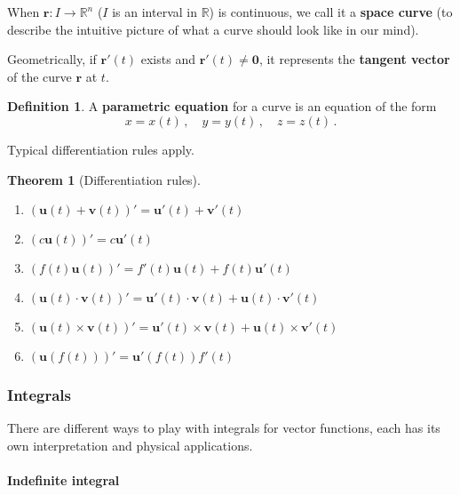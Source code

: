 \documentclass[
]{article}
\newtheorem{theorem}{Theorem}[section]
\theoremstyle{definition}
\newtheorem{definition}{Definition}[section]
\theoremstyle{definition}
\theoremstyle{definition}
\theoremstyle{definition}
\theoremstyle{remark}
\begin{document}
When \(\mathbf{r}:I \to \mathbb{R}^n\) (\(I\) is an interval in \(\mathbb{R}\)) is continuous,
we call it a \textbf{space curve} (to describe the intuitive picture of what
a curve should look like in our mind).

Geometrically, if \(\mathbf{r}'(t)\) exists and \(\mathbf{r}'(t) \not= \mathbf{0}\), it
represents the \textbf{tangent vector} of the curve \(\mathbf{r}\) at \(t\).

\begin{definition}
A \textbf{parametric equation} for a curve is an equation of the form
\[
x=x(t)\,, \quad  y = y(t)\,, \quad z = z(t) \,.
\]
\end{definition}

Typical differentiation rules apply.

\begin{theorem}[Differentiation rules]
\leavevmode

\begin{enumerate}
\def\labelenumi{\arabic{enumi}.}
\item
  \((\mathbf{u}(t) + \mathbf{v}(t))' = \mathbf{u}'(t) + \mathbf{v}'(t)\)
\item
  \((c \mathbf{u}(t))' = c \mathbf{u}'(t)\)
\item
  \((f(t) \mathbf{u}(t))' = f'(t) \mathbf{u}(t) + f(t) \mathbf{u}'(t)\)
\item
  \((\mathbf{u}(t) \cdot \mathbf{v}(t))' = \mathbf{u}'(t)\cdot \mathbf{v}(t) + \mathbf{u}(t)\cdot \mathbf{v}'(t)\)
\item
  \((\mathbf{u}(t) \times \mathbf{v}(t))' = \mathbf{u}'(t)\times \mathbf{v}(t) + \mathbf{u}(t)\times \mathbf{v}'(t)\)
\item
  \((\mathbf{u}(f(t)))' = \mathbf{u}'(f(t)) f'(t)\)
\end{enumerate}

\end{theorem}

\subsubsection{Integrals}\label{integrals}

There are different ways to play with integrals for vector functions,
each has its own interpretation and physical applications.

\paragraph{Indefinite integral}\label{indefinite-integral}
\end{document}
